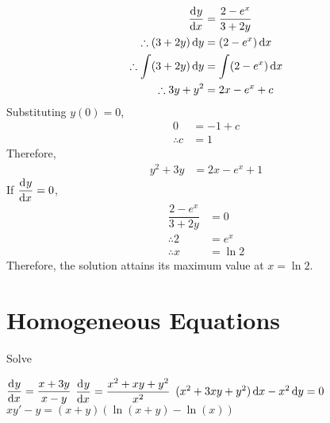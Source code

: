 \documentclass[fleqn, a4paper, 12pt, oneside]{amsart}
\theoremstyle{definition}
\theoremstyle{theorem}
\begin{document}
\begin{solution}
	\begin{align*}
		\dod{y}{x} &= \dfrac{2 - e^x}{3 + 2y}\\
		\therefore (3 + 2y) \dif y &= (2 - e^x) \dif x\\
		\therefore \int (3 + 2y) \dif y &= \int (2 - e^x) \dif x\\
		\therefore 3y + y^2 &= 2x - e^x + c
	\end{align*}
	Substituting $y(0) = 0$,
	\begin{align*}
		0 &= -1 + c\\
		\therefore c &= 1
	\end{align*}
	Therefore,
	\begin{align*}
		y^2 + 3y &= 2x - e^x + 1
	\end{align*}
	If $\dod{y}{x} = 0$,
	\begin{align*}
		\dfrac{2 - e^x}{3 + 2y} &= 0\\
		\therefore 2 &= e^x\\
		\therefore x &= \ln 2
	\end{align*}
	Therefore, the solution attains its maximum value at $x = \ln 2$.
\end{solution}

\part{Homogeneous Equations}

\begin{question}
	Solve
	\begin{tasks}
		\task $\dod{y}{x} = \dfrac{x + 3y}{x - y}$
		\task $\dod{y}{x} = \dfrac{x^2 + xy + y^2}{x^2}$
		\task $(x^2 + 3xy + y^2) \dif x - x^2 \dif y = 0$
		\task $x y' - y = (x + y)\left( \ln (x + y)  - \ln (x) \right)$
	\end{tasks}
\end{question}
\end{document}
